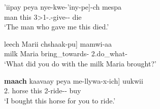 \begin{exe}\ex\label{JamDep}
\begin{xlist}
\ex\gll  {\rm[}'iipay peya nye-kwe-'iny-pe{\rm]}-ch mespa\\
\hspaceThis{[}man this 3\textgreater 1-\sbj{}.\relativ{}-give-\dem{}-\nom{} die\\
\glt `The man who gave me this died.'

\ex\gll  {\rm[}leech Marii chshaak-pu{\rm]} mamwi-aa\\
\hspaceThis{[}milk Maria bring\_towards-\dem{} 2.do\_what-\question{}\\
\glt `What did you do with the milk Maria brought?'


\ex\gll  {\rm[}\textbf{maach} kaavaay peya me-llywa-x-ich{\rm]} uukwii\\
\hspaceThis{[}2\sg{}.\nom{} horse this 2-ride-\irr{}-\purp{} buy\\
\glt `I bought this horse for you to ride.' %

\end{xlist}
\end{exe}

